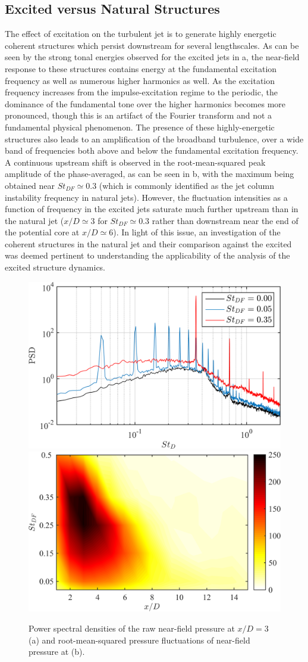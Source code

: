 \subsection{Excited versus Natural Structures}
The effect of excitation on the turbulent jet is to generate highly energetic coherent structures which persist downstream for several lengthscales.
As can be seen by the strong tonal energies observed for the excited jets in a, the near-field response to these structures contains energy at the fundamental excitation frequency as well as numerous higher harmonics as well.
As the excitation frequency increases from the impulse-excitation regime to the periodic, the dominance of the fundamental tone over the higher harmonics becomes more pronounced, though this is an artifact of the Fourier transform and not a fundamental physical phenomenon. 
The presence of these highly-energetic structures also leads to an amplification of the broadband turbulence, over a wide band of frequencies both above and below the fundamental excitation frequency.
A continuous upstream shift is observed in the root-mean-squared peak amplitude of the phase-averaged, as can be seen in b, with the maximum being obtained near $St_{DF} \simeq 0.3$ (which is commonly identified as the jet column instability frequency in natural jets).
However, the fluctuation intensities as a function of frequency in the excited jets saturate much further upstream than in the natural jet ($x/D \simeq 3$ for $St_{DF} \simeq 0.3$ rather than downstream near the end of the potential core at $x/D \simeq 6$).
In light of this issue, an investigation of the coherent structures in the natural jet and their comparison against the excited was deemed pertinent to understanding the applicability of the analysis of the excited structure dynamics.
\begin{figure}
	\centering
	\includegraphics[width=0.44\linewidth]{Figures/sect_nearfield_spectra.png}
	\includegraphics[width=0.46\linewidth]{Figures/sect_nearfield_prms.png}
	\caption{Power spectral densities of the raw near-field pressure at $x/D = 3$ (a) and root-mean-squared pressure fluctuations of near-field pressure at (b).}
	\label{fig:sect_nearfield_spectra_prms}
\end{figure}


